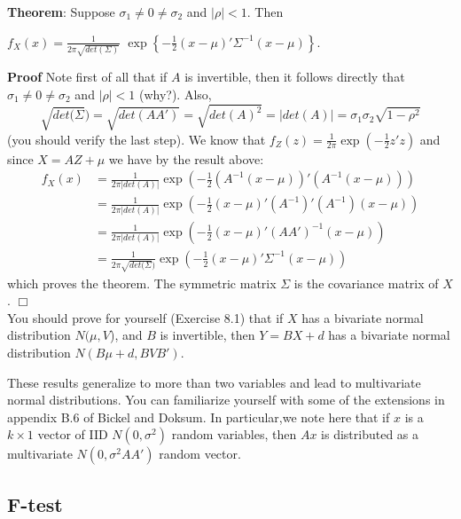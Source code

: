 \documentclass[12pt,oneside]{article}
\begin{document}
\textbf{Theorem}: Suppose $\sigma_1 \neq 0 \neq \sigma_2$ and $|\rho|<
1$. Then \\
\begin{center}
$f_X (x) = \frac{1}{2 \pi \sqrt{det(\Sigma)}}$ $\exp \left\{-
  \frac{1}{2} (x - \mu)' \Sigma^{-1} (x - \mu) \right\}$.
\end{center}

\textbf{Proof}
Note first of all that if $A$ is invertible, then it follows directly that $\sigma_1 \neq 0 \neq \sigma_2$ and $|\rho| < 1$ (why?). Also, $$\sqrt{det(\Sigma}) = \sqrt{det(AA')} = \sqrt{det(A)^2} = |det(A)| = \sigma_1 \sigma_2 \sqrt{1 - \rho^2}$$ (you should verify the last step). We know that $f_Z(z) = \frac{1}{2 \pi} \exp \left( - \frac{1}{2} z'z \right)$ and since $X = AZ + \mu$ we have by the result above:
\begin{align*}
f_X(x) &= \frac{1}{2 \pi |det(A)|} \exp \left( - \frac{1}{2} (A^{-1}(x -
    \mu))'(A^{-1}(x- \mu)) \right) \\
    &= \frac{1}{2 \pi |det(A)|} \exp
    \left( - \frac{1}{2} (x - \mu)'(A^{-1})'(A^{-1})(x- \mu) \right) \\
   &=\frac{1}{2 \pi |det(A)|} \exp \left( - \frac{1}{2} (x -
    \mu)'(AA')^{-1}(x- \mu) \right) \\
 &= \frac{1}{2 \pi \sqrt{det(\Sigma})} \exp
    \left( - \frac{1}{2} (x - \mu)'\Sigma^{-1}(x- \mu) \right)
\end{align*}
which proves the theorem. The symmetric matrix $\Sigma$ is the covariance matrix of $X$. $\Box$ \\

You should prove for yourself (Exercise 8.1) that if $X$ has a bivariate normal distribution $N(\mu, V$), and $B$ is invertible, then $Y = BX + d$ has a bivariate normal distribution $N(B\mu + d, BVB')$.


These results generalize to more than two variables and lead to multivariate normal distributions. You can familiarize yourself with some of the extensions in appendix B.6 of Bickel and Doksum. In particular,we note here that  if $x$ is a $k \times 1$ vector of IID $N(0, \sigma^2)$ random variables, then $Ax$ is distributed as a multivariate $N(0, \sigma^2 AA')$ random vector.

\subsection{F-test}
\end{document}
